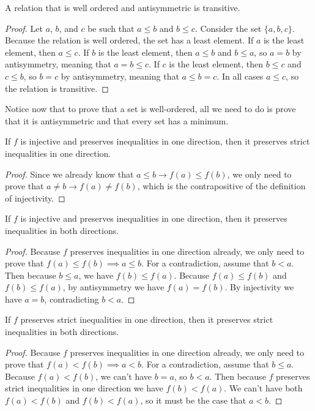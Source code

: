 \documentclass[../math.tex]{subfiles}
\begin{document}
\begin{instance} \label{wo_trans}
    A relation that is well ordered and antisymmetric is transitive.
\end{instance}
\begin{proof}
    Let $a$, $b$, and $c$ be such that $a \leq b$ and $b \leq c$.  Consider the
    set $\{a, b, c\}$.  Because the relation is well ordered, the set has a
    least element.  If $a$ is the least element, then $a \leq c$.  If $b$ is the
    least element, then $a \leq b$ and $b \leq a$, so $a = b$ by antisymmetry,
    meaning that $a = b \leq c$.  If $c$ is the least element, then $b \leq c$
    and $c \leq b$, so $b = c$ by antisymmetry, meaning that $a \leq b = c$.  In
    all cases $a \leq c$, so the relation is transitive.
\end{proof}

Notice now that to prove that a set is well-ordered, all we need to do is prove
that it is antisymmetric and that every set has a minimum.

\begin{instance} \label{homo_le_lt}
    If $f$ is injective and preserves inequalities in one direction, then it
    preserves strict inequalities in one direction.
\end{instance}
\begin{proof}
    Since we already know that $a \leq b \rightarrow f(a) \leq f(b)$, we only
    need to prove that $a \neq b \rightarrow f(a) \neq f(b)$, which is the
    contrapositive of the definition of injectivity.
\end{proof}

\begin{instance} \label{homo_le_le2}
    If $f$ is injective and preserves inequalities in one direction, then it
    preserves inequalities in both directions.
\end{instance}
\begin{proof}
    Because $f$ preserves inequalities in one direction already, we only need to
    prove that $f(a) \leq f(b) \implies a \leq b$.  For a contradiction, assume
    that $b < a$.  Then because $b \leq a$, we have $f(b) \leq f(a)$.  Because
    $f(a) \leq f(b)$ and $f(b) \leq f(a)$, by antisymmetry we have $f(a) =
    f(b)$.  By injectivity we have $a = b$, contradicting $b < a$.
\end{proof}

\begin{instance} \label{homo_lt_lt2}
    If $f$ preserves strict inequalities in one direction, then it preserves
    strict inequalities in both directions.
\end{instance}
\begin{proof}
    Because $f$ preserves inequalities in one direction already, we only need to
    prove that $f(a) < f(b) \implies a < b$.  For a contradiction, assume that
    $b \leq a$.  Because $f(a) < f(b)$, we can't have $b = a$, so $b < a$.  Then
    because $f$ preserves strict inequalities in one direction we have $f(b) <
    f(a)$.  We can't have both $f(a) < f(b)$ and $f(b) < f(a)$, so it must be
    the case that $a < b$.
\end{proof}
\end{document}

